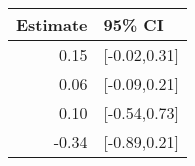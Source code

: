 \begin{tabular}{rl}
  \hline
Estimate & 95\% CI \\ 
  \hline
0.15 & [-0.02,0.31] \\ 
  0.06 & [-0.09,0.21] \\ 
  0.10 & [-0.54,0.73] \\ 
  -0.34 & [-0.89,0.21] \\ 
   \hline
\end{tabular}


